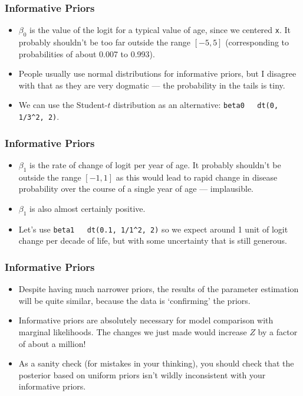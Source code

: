 \documentclass{beamer}
\begin{document}
\begin{frame}[fragile]
\frametitle{Informative Priors}

\begin{itemize}
\item $\beta_0$ is the value of the logit for a typical value of age,
since we centered \texttt{x}.
It probably shouldn't be too far outside the range $[-5, 5]$ (corresponding to
probabilities of about 0.007 to 0.993). \pause
\item People usually use normal distributions for informative priors, but I
disagree with that as they are very dogmatic --- the probability in the tails
is tiny.\pause
\item We can use the Student-$t$ distribution as an alternative:
\texttt{beta0 ~ dt(0, 1/3^2, 2)}.
\end{itemize}

\end{frame}


\begin{frame}[fragile]
\frametitle{Informative Priors}

\begin{itemize}
\item $\beta_1$ is the rate of change of logit per year of age. It
probably shouldn't be outside the range $[-1, 1]$
as this would lead to rapid change in disease probability over the course
of a single year of age --- implausible.\pause
\item $\beta_1$ is also almost certainly positive.\pause
\item Let's use \texttt{beta1 ~ dt(0.1, 1/1^2, 2)} so we expect
around 1 unit of logit change per decade of life, but with some uncertainty
that is still generous.
\end{itemize}

\end{frame}

\begin{frame}
\frametitle{Informative Priors}
\begin{itemize}
\item Despite having much narrower priors, the results of the parameter estimation
will be quite similar, because the data is `confirming' the priors.\pause
\item Informative priors are absolutely necessary for model comparison with
marginal likelihoods. The changes we just made would increase $Z$ by a factor
of about a million!\pause
\item As a sanity check (for mistakes in your thinking), you should check
that the posterior based on uniform priors isn't wildly inconsistent with
your informative priors.
\end{itemize}

\end{frame}
\end{document}
